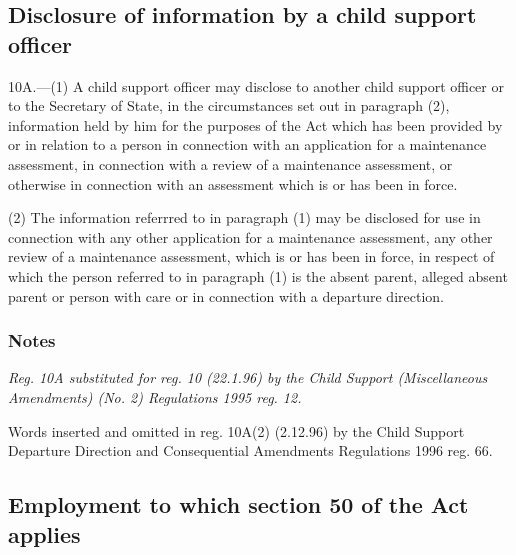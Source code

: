 \documentclass[a4paper]{article}
\newcommand\amendment[1]{\subsubsection*{Notes}{\itshape\frenchspacing\footnotesize #1 \par}}
\begin{document}
\subsection[10A. Disclosure of information by a child support officer]{Disclosure of information by a child support officer}

10A.—(1) A child support officer may disclose to another child support officer or to the Secretary of State, in the circumstances set out in paragraph (2), information held by him for the purposes of the Act which has been provided by or in relation to a person in connection with an application for a maintenance assessment, in connection with a review of a maintenance assessment, or otherwise in connection with an assessment which is or has been in force.

(2) The information referrred to in paragraph (1) may be disclosed for use in connection with any other application for a maintenance assessment, 
any other review of a maintenance assessment, which is or has been in force, in respect of which the person referred to in paragraph (1) is the absent parent, alleged absent parent or person with care
or in connection with a departure direction.  %

\amendment{
Reg. 10A substituted for reg. 10 (22.1.96) by the Child Support (Miscellaneous Amendments) (No. 2) Regulations 1995 reg. 12.

Words inserted and omitted in reg. 10A(2) (2.12.96) by the Child Support Departure Direction and Consequential Amendments Regulations 1996 reg. 66.
}

\subsection[11. Employment to which section 50 of the Act applies]{Employment to which section 50 of the Act applies}
\end{document}

